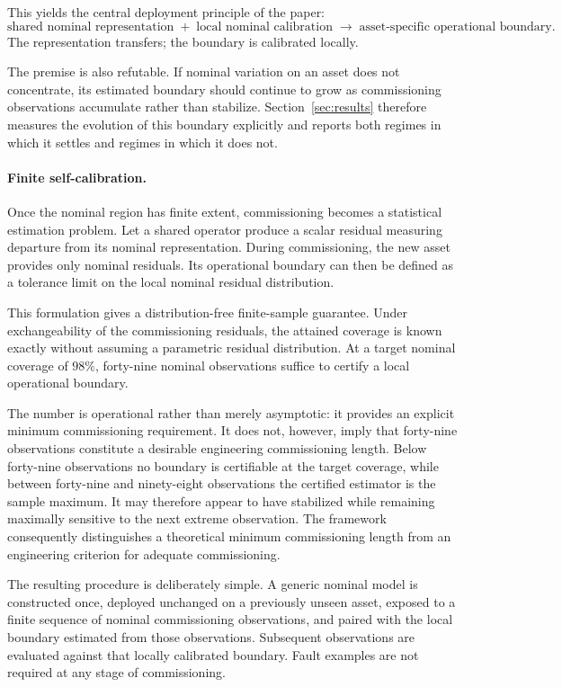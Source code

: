 \documentclass[a4paper]{cas-sc}
\begin{document}
This yields the central deployment principle of the paper:
\[
\boxed{
\text{shared nominal representation}
\;+\;
\text{local nominal calibration}
\;\longrightarrow\;
\text{asset-specific operational boundary}.
}
\]
The representation transfers; the boundary is calibrated locally.

The premise is also refutable. If nominal variation on an asset does not
concentrate, its estimated boundary should continue to grow as commissioning
observations accumulate rather than stabilize. Section~\ref{sec:results}
therefore measures the evolution of this boundary explicitly and reports both
regimes in which it settles and regimes in which it does not.

\paragraph{Finite self-calibration.}
Once the nominal region has finite extent, commissioning becomes a statistical
estimation problem. Let a shared operator produce a scalar residual measuring
departure from its nominal representation. During commissioning, the new asset
provides only nominal residuals. Its operational boundary can then be defined
as a tolerance limit on the local nominal residual distribution.

This formulation gives a distribution-free finite-sample guarantee. Under
exchangeability of the commissioning residuals, the attained coverage is known
exactly without assuming a parametric residual distribution. At a target
nominal coverage of \(98\%\), forty-nine nominal observations suffice to
certify a local operational boundary.

The number is operational rather than merely asymptotic: it provides an
explicit minimum commissioning requirement. It does not, however, imply that
forty-nine observations constitute a desirable engineering commissioning
length. Below forty-nine observations no boundary is certifiable at the target
coverage, while between forty-nine and ninety-eight observations the certified
estimator is the sample maximum. It may therefore appear to have stabilized
while remaining maximally sensitive to the next extreme observation. The
framework consequently distinguishes a theoretical minimum commissioning
length from an engineering criterion for adequate commissioning.

The resulting procedure is deliberately simple. A generic nominal model is
constructed once, deployed unchanged on a previously unseen asset, exposed to a
finite sequence of nominal commissioning observations, and paired with the
local boundary estimated from those observations. Subsequent observations are
evaluated against that locally calibrated boundary. Fault examples are not
required at any stage of commissioning.
\end{document}
